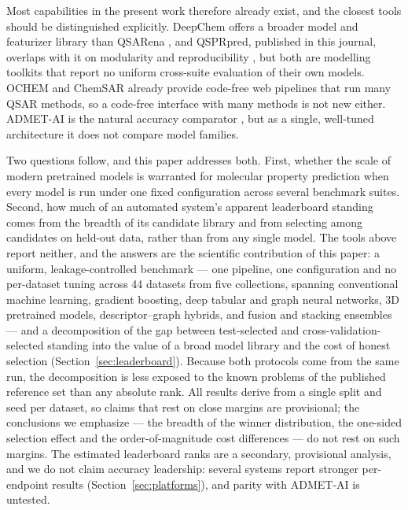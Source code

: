 Most capabilities in the present work therefore already exist, and the closest tools should be distinguished explicitly. DeepChem offers a broader model and featurizer library than QSARena \cite{ramsundar2019deepchem}, and QSPRpred, published in this journal, overlaps with it on modularity and reproducibility \cite{maagdenberg2024qsprpred}, but both are modelling toolkits that report no uniform cross-suite evaluation of their own models. OCHEM \cite{sushko2011ochem} and ChemSAR \cite{dong2017chemsar} already provide code-free web pipelines that run many QSAR methods, so a code-free interface with many methods is not new either. ADMET-AI is the natural accuracy comparator \cite{swanson2024admetai}, but as a single, well-tuned architecture it does not compare model families.

Two questions follow, and this paper addresses both. First, whether the scale of modern pretrained models is warranted for molecular property prediction when every model is run under one fixed configuration across several benchmark suites. Second, how much of an automated system's apparent leaderboard standing comes from the breadth of its candidate library and from selecting among candidates on held-out data, rather than from any single model. The tools above report neither, and the answers are the scientific contribution of this paper: a uniform, leakage-controlled benchmark --- one pipeline, one configuration and no per-dataset tuning across 44 datasets from five collections, spanning conventional machine learning, gradient boosting, deep tabular and graph neural networks, 3D pretrained models, descriptor--graph hybrids, and fusion and stacking ensembles --- and a decomposition of the gap between test-selected and cross-validation-selected standing into the value of a broad model library and the cost of honest selection (Section~\ref{sec:leaderboard}). Because both protocols come from the same run, the decomposition is less exposed to the known problems of the published reference set than any absolute rank. All results derive from a single split and seed per dataset, so claims that rest on close margins are provisional; the conclusions we emphasize --- the breadth of the winner distribution, the one-sided selection effect and the order-of-magnitude cost differences --- do not rest on such margins. The estimated leaderboard ranks are a secondary, provisional analysis, and we do not claim accuracy leadership: several systems report stronger per-endpoint results (Section~\ref{sec:platforms}), and parity with ADMET-AI is untested.

